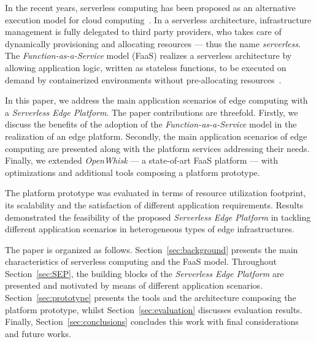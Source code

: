 In the recent years, serverless computing has been proposed as an alternative execution model for cloud computing~\cite{Lloyd18serverless}. In a serverless architecture, infrastructure management is fully delegated to third party providers, who takes care of dynamically provisioning and allocating resources --- thus the name \textit{serverless}. The \textit{Function-as-a-Service} model (FaaS) realizes a serverless architecture by allowing application logic, written as stateless functions, to be executed on demand by containerized environments without pre-allocating resources~\cite{Roberts:2018}. 

In this paper, we address the main application scenarios of edge computing with a \textit{Serverless Edge Platform}. The paper contributions are threefold. Firstly, we discuss the benefits of the adoption of the \textit{Function-as-a-Service} model in the realization of an edge platform. Secondly, the main application scenarios of edge computing are presented along with 
the platform services addressing their needs. Finally, we extended \textit{OpenWhisk} --- a state-of-art FaaS platform --- with optimizations and additional tools composing a platform prototype. 

The platform prototype was evaluated in terms of resource utilization footprint, its scalability and the satisfaction of different application requirements. Results demonstrated the feasibility of the proposed \textit{Serverless Edge Platform} in tackling different application scenarios in heterogeneous types of edge infrastructures.


The paper is organized as follows. Section~\ref{sec:background} presents the main characteristics of serverless computing and the FaaS model.
Throughout Section~\ref{sec:SEP}, the building blocks of the \textit{Serverless Edge Platform} are presented and motivated by means of different application scenarios. Section~\ref{sec:prototype} presents the tools and the architecture composing the platform prototype, whilst Section~\ref{sec:evaluation} discusses evaluation results. Finally, Section~\ref{sec:conclusions} concludes this work with final considerations and future works.

